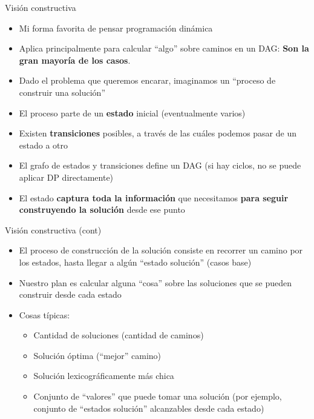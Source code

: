 \documentclass{beamer}
\begin{document}
\begin{frame}{Visión constructiva}
	\begin{itemize}
		\item Mi forma favorita de pensar programación dinámica
        \item Aplica principalmente para calcular ``algo'' sobre caminos en un DAG: \textbf{Son la gran mayoría de los casos}.
		\item Dado el problema que queremos encarar, imaginamos un ``proceso de construir una solución''
		\item El proceso parte de un \textbf{estado} inicial (eventualmente varios)
		\item Existen \textbf{transiciones} posibles, a través de las cuáles podemos pasar de un estado a otro
		\item El grafo de estados y transiciones define un DAG (si hay ciclos, no se puede aplicar DP directamente)
		\item El estado \textbf{captura toda la información} que necesitamos \textbf{para seguir construyendo la solución} desde ese punto
	\end{itemize}
\end{frame}

\begin{frame}{Visión constructiva (cont)}
	\begin{itemize}
		\item El proceso de construcción de la solución consiste en recorrer un camino por los estados, hasta llegar a algún ``estado solución'' (casos base)
		\item Nuestro plan es calcular alguna ``cosa'' sobre las soluciones que se pueden construir desde cada estado
		\item Cosas típicas:
			\begin{itemize}
				 \item Cantidad de soluciones (cantidad de caminos)
				 \item Solución óptima (``mejor'' camino)
				 \item Solución lexicográficamente más chica
				 \item Conjunto de ``valores'' que puede tomar una solución (por ejemplo, conjunto de ``estados solución'' alcanzables desde cada estado)
			\end{itemize}
	\end{itemize}
\end{frame}
\end{document}
